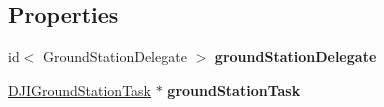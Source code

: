 \subsection*{Properties}
\begin{DoxyCompactItemize}
\item 
\hypertarget{protocol_d_j_i_ground_station-p_a2302bca047813b8e4384488f87d32acd}{id$<$ Ground\+Station\+Delegate $>$ {\bfseries ground\+Station\+Delegate}}\label{protocol_d_j_i_ground_station-p_a2302bca047813b8e4384488f87d32acd}

\item 
\hypertarget{protocol_d_j_i_ground_station-p_ab9ed01091b03fb8aaafa2dba4891e899}{\hyperlink{interface_d_j_i_ground_station_task}{D\+J\+I\+Ground\+Station\+Task} $\ast$ {\bfseries ground\+Station\+Task}}\label{protocol_d_j_i_ground_station-p_ab9ed01091b03fb8aaafa2dba4891e899}

\end{DoxyCompactItemize}


